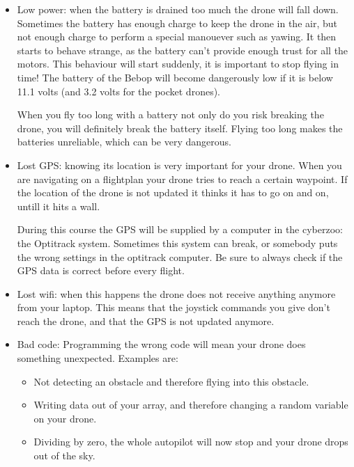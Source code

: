 \documentclass{article}
\begin{document}
\begin{itemize}
\item Low power: when the battery is drained too much the drone will fall down. Sometimes the battery has enough charge to keep the drone in the air, but not enough charge to perform a special manouever such as yawing. It then starts to behave strange, as the battery can't provide enough trust for all the motors. This behaviour will start suddenly, it is important to stop flying in time! The battery of the Bebop will become dangerously low if it is below 11.1 volts (and 3.2 volts for the pocket drones).  

When you fly too long with a battery not only do you risk breaking the drone, you will definitely break the battery itself. Flying too long makes the batteries unreliable, which can be very dangerous. 
\item Lost GPS: knowing its location is very important for your drone. When you are navigating on a flightplan your drone tries to reach a certain waypoint. If the location of the drone is not updated it thinks it has to go on and on, untill it hits a wall. 

During this course the GPS will be supplied by a computer in the cyberzoo: the Optitrack system. Sometimes this system can break, or somebody puts the wrong settings in the optitrack computer. Be sure to always check if the GPS data is correct before every flight. 

\item Lost wifi: when this happens the drone does not receive anything anymore from your laptop. This means that the joystick commands you give don't reach the drone, and that the GPS is not updated anymore. 
\item Bad code: Programming the wrong code will mean your drone does something unexpected. Examples are: 
\begin{itemize}
	\item Not detecting an obstacle and therefore flying into this obstacle. 
	\item Writing data out of your array, and therefore changing a random variable on your drone. 
	\item Dividing by zero, the whole autopilot will now stop and your drone drops out of the sky. 
\end{itemize}
\end{itemize}
\end{document}
